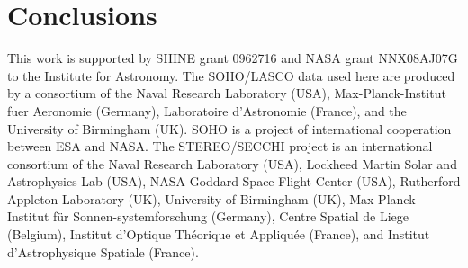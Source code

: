 \documentclass[preprint2]{aastex}
\begin{document}
\section{Conclusions}
\label{sect_conclusions}




\acknowledgments

This work is supported by SHINE grant 0962716 and NASA grant NNX08AJ07G to the Institute for Astronomy. The SOHO/LASCO data used here are produced by a consortium of the Naval Research Laboratory (USA), Max-Planck-Institut fuer Aeronomie (Germany), Laboratoire d'Astronomie (France), and the University of Birmingham (UK). SOHO is a project of international cooperation between ESA and NASA. The STEREO/SECCHI project is an international consortium of the Naval Research Laboratory (USA), Lockheed Martin Solar and Astrophysics Lab (USA), NASA Goddard Space Flight Center (USA), Rutherford Appleton Laboratory (UK), University of Birmingham (UK), Max-Planck-Institut f\"{u}r Sonnen-systemforschung (Germany), Centre Spatial de Liege (Belgium), Institut d'Optique Th\'{e}orique et Appliqu\'{e}e (France), and Institut d'Astrophysique Spatiale (France). 


\end{document}
